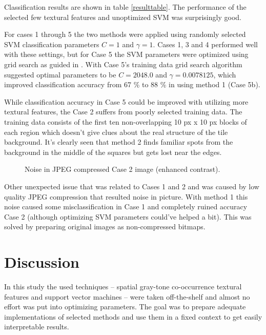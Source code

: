 \documentclass[11pt,twocolumn]{article}
\begin{document}
Classification results are shown in table \ref{resulttable}.
The performance of the selected few textural features and unoptimized
SVM was surprisingly good.

For cases 1 through 5 the two methods were applied using randomly
selected SVM classification parameters $C=1$ and $\gamma=1$.
Cases 1, 3 and 4 performed well with these settings,
but for Case 5 the SVM parameters were optimized using grid
search as guided in \cite{libsvm_guide}.
With Case 5's training data grid search algorithm suggested
optimal parameters to be $C=2048.0$ and $\gamma=0.0078125$,
which improved classification accuracy from 67 \% to 88 \% in
using method 1 (Case 5b).

While classification accuracy in Case 5 could be improved
with utilizing more textural features, the Case 2
suffers from poorly selected training data.
The training data consists of the first ten non-overlapping
10 px x 10 px blocks of each region which doesn't
give clues about the real structure of the tile background.
It's clearly seen that method 2 finds familiar spots from
the background in the middle of the squares but 
gets lost near the edges.

\begin{figure}[htb]
\centering
\setlength\fboxsep{0pt}
\setlength\fboxrule{1pt}
\caption{Noise in JPEG compressed Case 2 image (enhanced contrast).}
\label{fig:level2_noise}
\end{figure}

Other unexpected issue that was related to Cases 1 and 2
and was caused by low quality JPEG compression
that resulted noise in picture.
With method 1 this noise caused some misclassification in
Case 1 and completely ruined accuracy Case 2
(although optimizing SVM parameters could've helped a bit).
This was solved by preparing original images as non-compressed
bitmaps.



\section{Discussion}\label{discussion}

In this study the used techniques --
spatial gray-tone co-occurrence textural features and support
vector machines -- were taken off-the-shelf and almost no effort
was put into optimizing parameters.
The goal was to prepare adequate implementations of selected
methods and use them in a fixed context to get easily
interpretable results.
\end{document}
